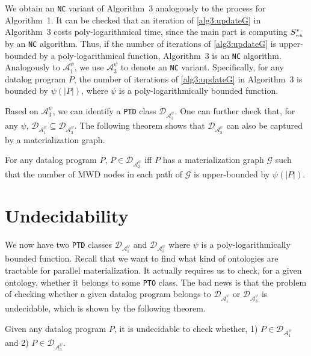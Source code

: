 \documentclass{article}
\begin{document}
We obtain an \texttt{NC} variant of Algorithm~3 analogously to the process for Algorithm~1. It can be checked that an iteration of \ref{alg3:updateG} in Algorithm~3 costs poly-logarithmical time, since the main part is computing $S^*_{\textit{\tiny rch}}$ by an \texttt{NC} algorithm. Thus, if the number of iterations of \ref{alg3:updateG} is upper-bounded by a poly-logarithmical function,
Algorithm~3 is an \texttt{NC} algorithm. Analogously to $\mathcal{A}_1^{\psi}$, we use $\mathcal{A}_3^{\psi}$ to denote an \texttt{NC} variant. Specifically, for any datalog program $P$, the number of iterations of \ref{alg3:updateG} in Algorithm~3 is
bounded by $\psi(|P|)$, where $\psi$ is a poly-logarithmically bounded function.

Based on $\mathcal{A}_3^{\psi}$, we can identify a \texttt{PTD} class $\mathcal{D}_{\mathcal{A}_3^{\psi}}$. One can further check that, for any $\psi$, $\mathcal{D}_{\mathcal{A}_1^{\psi}}\subseteq\mathcal{D}_{\mathcal{A}_3^{\psi}}$.
The following theorem shows that $\mathcal{D}_{\mathcal{A}_3^{\psi}}$ can also be captured by a materialization graph.

\begin{theorem}
For any datalog program $P$, $P\in\mathcal{D}_{\mathcal{A}_3^{\psi}}$ iff $P$ has a materialization graph $\mathcal{G}$ such that the number of MWD nodes in each path of $\mathcal{G}$ is upper-bounded by $\psi(|P|)$.
\end{theorem}

\section{Undecidability}

We now have two \texttt{PTD} classes $\mathcal{D}_{\mathcal{A}_1^{\psi}}$ and $\mathcal{D}_{\mathcal{A}_3^{\psi}}$
where $\psi$ is a poly-logarithmically bounded function. Recall that we want to find what kind of ontologies are tractable for parallel materialization. It actually requires us to check, for a given ontology, whether it belongs to some \texttt{PTO} class. The bad news is that the problem of checking whether a given datalog program belongs to $\mathcal{D}_{\mathcal{A}_1^{\psi}}$ or $\mathcal{D}_{\mathcal{A}_3^{\psi}}$ is undecidable, which is shown by the following theorem.

\begin{theorem} Given any datalog program $P$, it is undecidable to check whether, 1) $P\in\mathcal{D}_{\mathcal{A}_1^{\psi}}$ and 2) $P\in\mathcal{D}_{\mathcal{A}_3^{\psi}}$.
\end{theorem}
\end{document}

